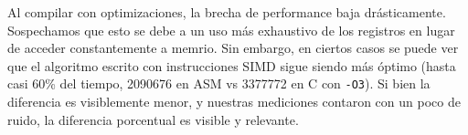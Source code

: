Al compilar con optimizaciones, la brecha de performance baja drásticamente. Sospechamos que esto se debe a un uso más exhaustivo de los registros en lugar de acceder constantemente a memrio. Sin embargo, en ciertos casos se puede ver que el algoritmo escrito con instrucciones SIMD sigue siendo más óptimo (hasta casi 60\% del tiempo, 2090676 en ASM vs 3377772 en C con \texttt{-O3}). Si bien la diferencia es visiblemente menor, y nuestras mediciones contaron con un poco de ruido, la diferencia porcentual es visible y relevante.